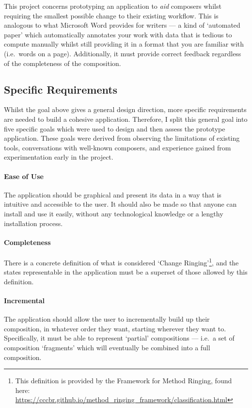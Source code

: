 \documentclass[12pt]{article}
\begin{document}
This project concerns prototyping an application to \emph{aid} composers whilst requiring the
smallest possible change to their existing workflow.  This is analogous to what Microsoft Word
provides for writers --- a kind of `automated paper' which automatically annotates your work with
data that is tedious to compute manually whilst still providing it in a format that you are familiar
with (i.e.\ words on a page).  Additionally, it must provide correct feedback regardless of the
completeness of the composition.

\subsection{Specific Requirements}\label{sec:requirements}

Whilst the goal above gives a general design direction, more specific requirements are needed to
build a cohesive application.  Therefore, I split this general goal into five specific goals which
were used to design and then assess the prototype application.  These goals were derived from
observing the limitations of existing tools, conversations with well-known composers, and experience
gained from experimentation early in the project.  

\paragraph{Ease of Use} The application should be graphical and present its data in a way that is
intuitive and accessible to the user.  It should also be made so that anyone can install and use it
easily, without any technological knowledge or a lengthy installation process.

\paragraph{Completeness} There is a concrete definition of what is considered `Change
Ringing'\footnote{This definition is provided by the Framework for Method Ringing, found here:
\url{https://cccbr.github.io/method_ringing_framework/classification.html}}, and the states
representable in the application must be a superset of those allowed by this definition.

\paragraph{Incremental} The application should allow the user to incrementally build up their
composition, in whatever order they want, starting wherever they want to.  Specifically, it must
be able to represent `partial' compositions --- i.e.\ a set of composition `fragments' which will
eventually be combined into a full composition.
\end{document}
